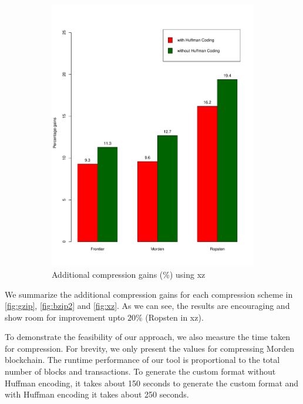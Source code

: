 \begin{figure}[H]
\begin{subfigure}{0.45\textwidth}
	\includegraphics[width=\textwidth]{plots/xz-vanilla}
	\caption{Additional compression gains (\%) using xz}
	\label{fig:xz}
\end{subfigure}
\caption{ }
\end{figure}
We summarize the additional compression gains for each compression scheme in \autoref{fig:gzip}, \autoref{fig:bzip2} and \autoref{fig:xz}.
As we can see, the results are encouraging and show room for improvement upto $20\%$ (Ropsten in xz).

To demonstrate the feasibility of our approach, we also measure the time taken for compression. 
For brevity, we only present the values for compressing Morden blockchain.
The runtime performance of our tool is proportional to the total number of blocks and transactions. 
To generate the custom format without Huffman encoding, it takes about 150 seconds to generate the custom format and with Huffman encoding it takes about 250 seconds. 



